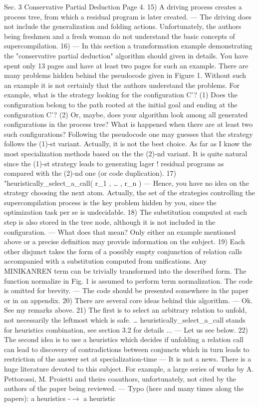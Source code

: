 Sec. 3 Conservative Partial Deduction
Page 4.
15) A driving process creates a process tree, from which a residual program is later created.
 --- The driving does not include the generalization and folding actions. Unfortunately, the authors being freshmen and a fresh woman do not understand the basic concepts of supercompilation.
16) --- In this section a transformation example demonstrating the "conservative partial deduction" algorithm should given in details. You have spent only 13 pages and have at least two pages for such an example.  There are many problems hidden behind the pseudocode given in Figure 1. Without such an example it is not certainly that the authors understand the problems. For example, what is the strategy looking for the configuration C'? (1) Does the configuration belong to the path rooted at the initial goal and ending at the configuration C'? (2) Or, maybe, does your algorithm look among all generated configurations in the process tree? What is happened when there are at least two such configurations? Following the pseudocode one may guesses that the strategy follows the (1)-st variant. Actually, it is not the best choice. As far as I know the most specialization methods based on the the (2)-nd variant. It is quite natural since the (1)-st strategy leads to generating lager !
 residual programs as compared with the (2)-nd one (or code duplication).
17) "heuristically_select_a_call( r_1 , … , r_n )
 --- Hence, you have no idea on the strategy choosing the next atom. Actually, the set of the strategies controlling the supercompilation process is the key problem hidden by you, since the optimization task per se is undecidable.
18) The substitution computed at each step is also stored in the tree node, although it is not included in the configuration.
 --- What does that mean? Only either an example mentioned above or a precise definition may provide information on the subject.
19) Each other disjunct takes the form of a possibly empty conjunction of relation calls accompanied with a substitution computed from unifications. Any MINIKANREN term can be trivially transformed into the described form. The function normalize in Fig. 1 is assumed to perform term normalization. The code is omitted for brevity.
 --- The code should be presented somewhere in the paper or in an appendix.
20) There are several core ideas behind this algorithm.
 --- Ok. See my remarks above.
21) The first is to select an arbitrary relation to unfold, not necessarily the leftmost which is safe. … heuristically_select_a_call stands for heuristics combination, see section 3.2 for details ...
 --- Let us see below.
22) The second idea is to use a heuristics which decides if unfolding a relation call can lead to discovery of contradictions between conjuncts which in turn leads to restriction of the answer set at specialization-time
 --- It is not a news. There is a huge literature devoted to this subject. For example, a large series of works by A. Pettorossi, M. Proietti and theirs coauthors, unfortunately, not cited by the authors of the paper being reviewed.
 --- Typo (here and many times along the papers): a heuristics -$\to$ a heuristic

